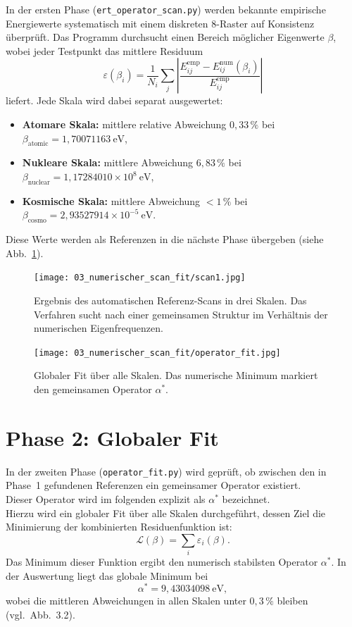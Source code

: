 In der ersten Phase (\texttt{ert\_operator\_scan.py}) werden bekannte empirische Energiewerte
systematisch mit einem diskreten $8$-Raster auf Konsistenz überprüft.  
Das Programm durchsucht einen Bereich möglicher Eigenwerte $\beta$,
wobei jeder Testpunkt das mittlere Residuum
\[
  \varepsilon(\beta_i)
  = \frac{1}{N_i}\sum_j 
    \left|\frac{E^{\mathrm{emp}}_{ij} - E^{\mathrm{num}}_{ij}(\beta_i)}{E^{\mathrm{emp}}_{ij}}\right|
\]
liefert.  
Jede Skala wird dabei separat ausgewertet:

\begin{itemize}
  \item \textbf{Atomare Skala:} mittlere relative Abweichung $0{,}33\,\%$ bei $\beta_\mathrm{atomic}=1{,}70071163~\si{\electronvolt}$,
  \item \textbf{Nukleare Skala:} mittlere Abweichung $6{,}83\,\%$ bei $\beta_\mathrm{nuclear}=1{,}17284010\times10^8~\si{\electronvolt}$,
  \item \textbf{Kosmische Skala:} mittlere Abweichung $<1\,\%$ bei $\beta_\mathrm{cosmo}=2{,}93527914\times10^{-5}~\si{\electronvolt}$.
\end{itemize}

Diese Werte werden als Referenzen in die nächste Phase übergeben
(siehe Abb.~\ref{fig:scan1}).

\begin{figure}
  \centering
  \texttt{[image: 03\_numerischer\_scan\_fit/scan1.jpg]}
  \caption{Ergebnis des automatischen Referenz-Scans in drei Skalen.
  Das Verfahren sucht nach einer gemeinsamen Struktur im Verhältnis
  der numerischen Eigenfrequenzen.}
  \label{fig:scan1}
\end{figure}

\newpage

\begin{figure}
  \centering
  \texttt{[image: 03\_numerischer\_scan\_fit/operator\_fit.jpg]}
  \caption{Globaler Fit über alle Skalen. Das numerische Minimum markiert
  den gemeinsamen Operator $\alpha^*$.}
  \label{fig:fit_operator}
\end{figure}

\section{Phase 2: Globaler Fit}
\label{sec:fit}

In der zweiten Phase (\texttt{operator\_fit.py}) wird geprüft, ob zwischen
den in Phase~1 gefundenen Referenzen ein gemeinsamer Operator existiert.
\\
Dieser Operator wird im folgenden explizit als $\alpha^*$ bezeichnet.
\\
Hierzu wird ein globaler Fit über alle Skalen durchgeführt,
dessen Ziel die Minimierung der kombinierten Residuenfunktion ist:
\[
  \mathcal{L}(\beta)
  = \sum_i \varepsilon_i(\beta).
\]
Das Minimum dieser Funktion ergibt den numerisch stabilsten Operator $\alpha^*$.
In der Auswertung liegt das globale Minimum bei
\[
  \alpha^* = 9{,}43034098~\si{\electronvolt},
\]
wobei die mittleren Abweichungen in allen Skalen unter $0{,}3\,\%$ bleiben
(vgl.~Abb.~3.2).



